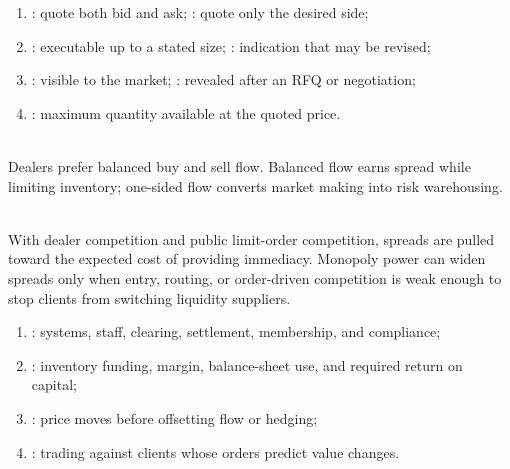 \begin{taxonomy} 
\begin{enumerate}[label=\roman*.]
\setlength{\itemsep}{0pt}
\item {}: quote both bid and ask; : quote only the desired side;
\item {}: executable up to a stated size; : indication that may be revised;
\item {}: visible to the market; : revealed after an RFQ or negotiation;
\item {}: maximum quantity available at the quoted price.
\end{enumerate}
\end{taxonomy}

\begin{principle} \\
Dealers prefer balanced buy and sell flow. Balanced flow earns spread while limiting inventory; one-sided flow converts market making into risk warehousing.
\end{principle}

\begin{principle} \\
With dealer competition and public limit-order competition, spreads are pulled toward the expected cost of providing immediacy. Monopoly power can widen spreads only when entry, routing, or order-driven competition is weak enough to stop clients from switching liquidity suppliers.
\end{principle}

\begin{taxonomy} 
\begin{enumerate}[label=\roman*.]
\setlength{\itemsep}{0pt}
\item {}: systems, staff, clearing, settlement, membership, and compliance;
\item {}: inventory funding, margin, balance-sheet use, and required return on capital;
\item {}: price moves before offsetting flow or hedging;
\item {}: trading against clients whose orders predict value changes.
\end{enumerate}
\end{taxonomy}

